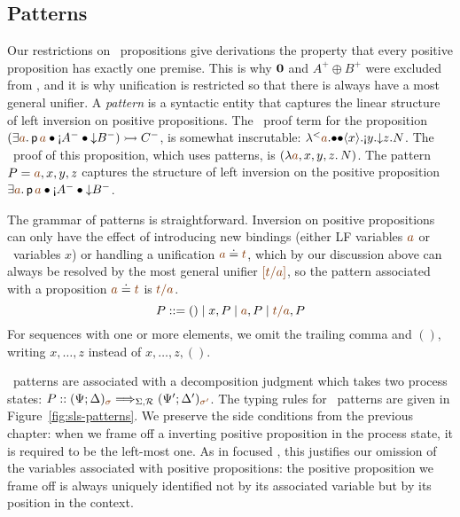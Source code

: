 \subsection{Patterns}
\label{sec:framework-patterns}


Our restrictions on \sls~propositions give derivations the property
that every positive proposition has exactly one premise.  This is why
$\mathbf{0}$ and $A^+ \oplus B^+$ were excluded from \sls, and it is why
unification is restricted so that there is always have a most general
unifier.  
%
A {\it pattern} is a syntactic entity that captures the linear
structure of left inversion on positive propositions. The \ollll~proof
term for the proposition
%
$(\exists \lf{a}.\,{\sf p}\,\lf{a} 
             \fuse {\gnab}A^-
             \fuse {\downarrow}B^-) \lefti C^-$,
%
is somewhat inscrutable:
${\tlaml{\texistsl{\lf{a}}
    {\tfusel{\tfusel{\tetap{x}{\tgnabl{y}{\tdownl{z}{N}}}}}}}}$. The
\sls~proof of this proposition, which uses patterns, is
$(\lambda \lf{a},x,y,z.\, N)$. The pattern $P = \lf{a}, x,y,z$ captures
the structure of left inversion on the positive proposition 
$\exists \lf{a}.\,{\sf p}\,\lf{a} 
             \fuse {\gnab}A^-
             \fuse {\downarrow}B^-$.

The grammar of patterns is straightforward.
% 
Inversion on positive propositions
can only have the effect of introducing new bindings (either LF
variables $\lf{a}$ or \sls~variables $x$) or handling a unification
$\lf{a} \doteq \lf{t}$, which by our discussion above can always be
resolved by the most general unifier $\lf{[t/a]}$, so the pattern associated
with a proposition $\lf{a} \doteq \lf{t}$ is $\lf{t/a}$. 
\[
P ::= () \mid x, P \mid \lf{a}, P \mid \lf{t/a}, P
\] 
For sequences with one or more elements, we omit the trailing
comma and $()$, writing $x, \ldots, z$ 
instead of $x, \ldots, z, ()$. 

\sls~patterns are associated with a decomposition judgment which takes
two process states: $P :: (\Psi; \Delta)_{\lf{\sigma}}
\Longrightarrow_{\Sigma,\subord} (\Psi'; \Delta')_{\lf{\sigma'}}$.
The typing rules for \sls~patterns are given in
Figure~\ref{fig:sls-patterns}. We preserve the side conditions from
the previous chapter: when we frame off a inverting positive
proposition in the process state, it is required to be the left-most
one. As in focused \ollll, this justifies our omission of the
variables associated with positive propositions: the positive
proposition we frame off is always uniquely identified not by its
associated variable but by its position in the context. 

